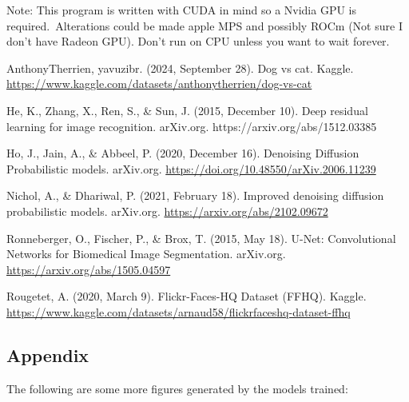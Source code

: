 \documentclass[12pt]{article}
\begin{document}
\vspace{15.5cm}
Note: This program is written with CUDA in mind so a Nvidia GPU is required.\
Alterations could be made apple MPS and possibly ROCm (Not sure I don't have Radeon GPU). Don't run on CPU unless you want to wait forever.

\pagebreak
\begin{thebibliography}{0}

  AnthonyTherrien,  yavuzibr. (2024, September 28). Dog vs cat. Kaggle. \url{https://www.kaggle.com/datasets/anthonytherrien/dog-vs-cat}

  He, K., Zhang, X., Ren, S., \& Sun, J. (2015, December 10). Deep residual learning for image recognition. arXiv.org. https://arxiv.org/abs/1512.03385 

  Ho, J., Jain, A., \& Abbeel, P. (2020, December 16). Denoising Diffusion Probabilistic models. arXiv.org. \url{https://doi.org/10.48550/arXiv.2006.11239} 

  Nichol, A., \& Dhariwal, P. (2021, February 18). Improved denoising diffusion probabilistic models. arXiv.org. \url{https://arxiv.org/abs/2102.09672}

  Ronneberger, O., Fischer, P., \& Brox, T. (2015, May 18). U-Net: Convolutional Networks for Biomedical Image Segmentation. arXiv.org. \url{https://arxiv.org/abs/1505.04597}

  Rougetet, A. (2020, March 9). Flickr-Faces-HQ Dataset (FFHQ). Kaggle. \url{https://www.kaggle.com/datasets/arnaud58/flickrfaceshq-dataset-ffhq}

\end{thebibliography}

\pagebreak
\subsection*{Appendix}
The following are some more figures generated by the models trained:\
\end{document}
